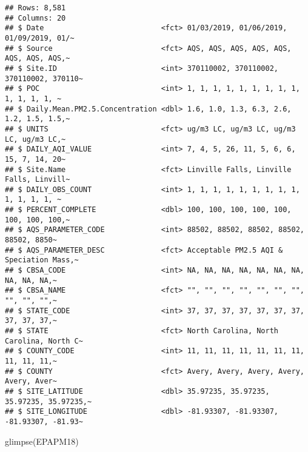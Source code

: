 \documentclass[
]{article}
\newenvironment{Shaded}{\begin{snugshade}}{\end{snugshade}}
\newcommand{\FunctionTok}[1]{\textcolor[rgb]{0.00,0.00,0.00}{#1}}
\newcommand{\NormalTok}[1]{#1}
\begin{document}
\begin{verbatim}
## Rows: 8,581
## Columns: 20
## $ Date                           <fct> 01/03/2019, 01/06/2019, 01/09/2019, 01/~
## $ Source                         <fct> AQS, AQS, AQS, AQS, AQS, AQS, AQS, AQS,~
## $ Site.ID                        <int> 370110002, 370110002, 370110002, 370110~
## $ POC                            <int> 1, 1, 1, 1, 1, 1, 1, 1, 1, 1, 1, 1, 1, ~
## $ Daily.Mean.PM2.5.Concentration <dbl> 1.6, 1.0, 1.3, 6.3, 2.6, 1.2, 1.5, 1.5,~
## $ UNITS                          <fct> ug/m3 LC, ug/m3 LC, ug/m3 LC, ug/m3 LC,~
## $ DAILY_AQI_VALUE                <int> 7, 4, 5, 26, 11, 5, 6, 6, 15, 7, 14, 20~
## $ Site.Name                      <fct> Linville Falls, Linville Falls, Linvill~
## $ DAILY_OBS_COUNT                <int> 1, 1, 1, 1, 1, 1, 1, 1, 1, 1, 1, 1, 1, ~
## $ PERCENT_COMPLETE               <dbl> 100, 100, 100, 100, 100, 100, 100, 100,~
## $ AQS_PARAMETER_CODE             <int> 88502, 88502, 88502, 88502, 88502, 8850~
## $ AQS_PARAMETER_DESC             <fct> Acceptable PM2.5 AQI & Speciation Mass,~
## $ CBSA_CODE                      <int> NA, NA, NA, NA, NA, NA, NA, NA, NA, NA,~
## $ CBSA_NAME                      <fct> "", "", "", "", "", "", "", "", "", "",~
## $ STATE_CODE                     <int> 37, 37, 37, 37, 37, 37, 37, 37, 37, 37,~
## $ STATE                          <fct> North Carolina, North Carolina, North C~
## $ COUNTY_CODE                    <int> 11, 11, 11, 11, 11, 11, 11, 11, 11, 11,~
## $ COUNTY                         <fct> Avery, Avery, Avery, Avery, Avery, Aver~
## $ SITE_LATITUDE                  <dbl> 35.97235, 35.97235, 35.97235, 35.97235,~
## $ SITE_LONGITUDE                 <dbl> -81.93307, -81.93307, -81.93307, -81.93~
\end{verbatim}

\begin{Shaded}
\begin{Highlighting}[]
\FunctionTok{glimpse}\NormalTok{(EPAPM18)}
\end{Highlighting}
\end{Shaded}
\end{document}
